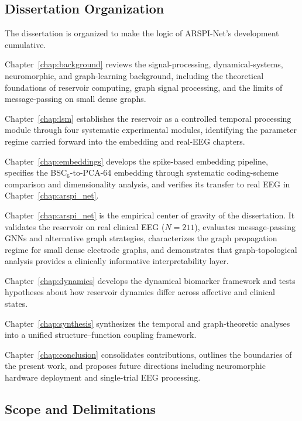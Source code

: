 \subsection{Dissertation Organization}

The dissertation is organized to make the logic of ARSPI-Net's development cumulative.

Chapter~\ref{chap:background} reviews the signal-processing, dynamical-systems, neuromorphic, and graph-learning background, including the theoretical foundations of reservoir computing, graph signal processing, and the limits of message-passing on small dense graphs.

Chapter~\ref{chap:lsm} establishes the reservoir as a controlled temporal processing module through four systematic experimental modules, identifying the parameter regime carried forward into the embedding and real-EEG chapters.

Chapter~\ref{chap:embeddings} develops the spike-based embedding pipeline, specifies the BSC$_6$-to-PCA-64 embedding through systematic coding-scheme comparison and dimensionality analysis, and verifies its transfer to real EEG in Chapter~\ref{chap:arspi_net}.

Chapter~\ref{chap:arspi_net} is the empirical center of gravity of the dissertation. It validates the reservoir on real clinical EEG ($N = 211$), evaluates message-passing GNNs and alternative graph strategies, characterizes the graph propagation regime for small dense electrode graphs, and demonstrates that graph-topological analysis provides a clinically informative interpretability layer.

Chapter~\ref{chap:dynamics} develops the dynamical biomarker framework and tests hypotheses about how reservoir dynamics differ across affective and clinical states.

Chapter~\ref{chap:synthesis} synthesizes the temporal and graph-theoretic analyses into a unified structure--function coupling framework.

Chapter~\ref{chap:conclusion} consolidates contributions, outlines the boundaries of the present work, and proposes future directions including neuromorphic hardware deployment and single-trial EEG processing.

\subsection{Scope and Delimitations}

